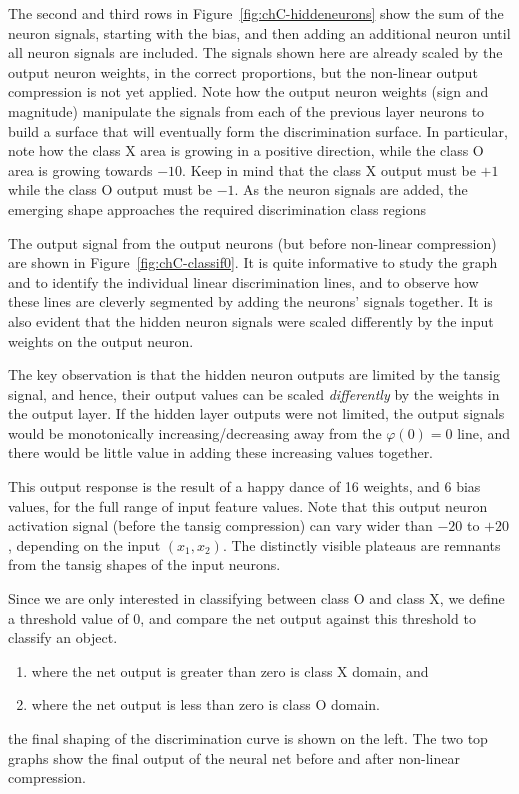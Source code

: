 The second and third rows in Figure~\ref{fig:chC-hiddeneurons} show the sum of the neuron signals, starting with the bias, and then adding an additional neuron until all neuron signals are included.  The signals shown here are already scaled by the output neuron weights, in the correct proportions, but the non-linear output compression is not yet applied. 
Note how the output neuron weights (sign and magnitude) manipulate the signals from each of the previous layer neurons to build a surface that will eventually form the discrimination surface.  In particular, note how the class X area is growing in a positive direction, while the class O area is growing towards $-10$.  Keep in mind that the class X output must be $+1$ while the class O output must be $-1$.  As the neuron signals are added, the emerging shape approaches the required discrimination class regions 
 
 
The output signal from the output neurons (but before non-linear compression) are shown in Figure~\ref{fig:chC-classif0}.   It is quite informative to study the graph and to identify the individual linear discrimination lines, and to observe how these lines are cleverly segmented by adding the neurons' signals together.   It is also evident that the hidden neuron signals  were scaled differently by the input weights on the output neuron.  

The key observation is that the hidden neuron outputs are limited by the tansig signal, and hence, their output values can be scaled \textit{differently} by the weights in the output layer.  If the hidden layer outputs were not limited, the output signals would be monotonically increasing/decreasing away from the $\varphi(0)=0$  line, and there would be little value in adding these increasing values together. 

This output response is the result of a happy dance of 16 weights, and 6 bias values, for the full range of input feature values.  Note that this output neuron activation signal (before the tansig compression) can vary wider than $-20$ to $+20$, depending on the input  $(x_1,x_2)$.    The distinctly visible plateaus are remnants from the tansig shapes of the input neurons.  

Since we are only interested in classifying between class O and class X, we define a threshold value of $0$, and compare the net output against this threshold to classify an object. 
\begin{enumerate}
\item where the net output is greater than zero is class X domain, and 
\item where the net output is less than zero is class O domain.  
\end{enumerate} 
the final shaping of the discrimination curve is shown on the left.  The two top graphs show the final output of the neural net before and after non-linear compression.  

